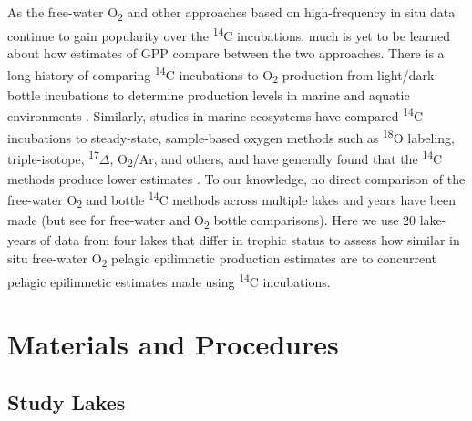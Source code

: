 \documentclass[12pt, oneside]{article}
\begin{document}
As the free-water O\textsubscript{2} and other approaches based on high-frequency in situ data continue to gain popularity over the \textsuperscript{14}C incubations, much is yet to be learned about how estimates of GPP compare between the two approaches. There is a long history of comparing \textsuperscript{14}C incubations to O\textsubscript{2} production from light/dark bottle incubations to determine production levels in marine and aquatic environments \citep{Williams_Heinemann_Marra_Purdie_1983, Bender_Grande_1987, Gazeau_Middelburg_Loijens_Vanderborght_Pizay_Gattuso_2007}. Similarly, studies in marine ecosystems have compared \textsuperscript{14}C incubations to steady-state, sample-based oxygen methods such as \textsuperscript{18}O labeling, triple-isotope, \textsuperscript{17}$\Delta$, O\textsubscript{2}/Ar, and others, and have generally found that the \textsuperscript{14}C methods produce lower estimates \citep{juranek_vitro_2005, quayetal2010, Hamme_Cassar_2012,Regaudie_2014}. To our knowledge, no direct comparison of the free-water O\textsubscript{2} and bottle \textsuperscript{14}C methods across multiple lakes and years have been made (but see \citealt{lauster_gross_2006} for free-water and O\textsubscript{2} bottle comparisons). Here we use 20 lake-years of data from four lakes that differ in trophic status to assess how similar in situ free-water O\textsubscript{2} pelagic epilimnetic production estimates are to concurrent pelagic epilimnetic estimates made using \textsuperscript{14}C incubations. 

\section*{Materials and Procedures}
\subsection*{Study Lakes} %
\end{document}
